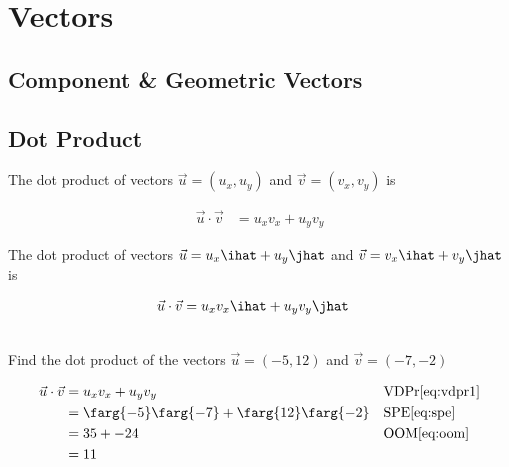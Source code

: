 %
%


\chapter{Vectors}

\section{Component \& Geometric Vectors}


\section{Dot Product}

\begin{definition}
The dot product of vectors $\vec{u}=(u_x,u_y)$ and $\vec{v}=(v_x, v_y)$ is 

\begin{align}
\vec{u} \cdot \vec{v} 	&= u_x v_x + u_y v_y  \label{eq:vdpr1}
\end{align}

The dot product of vectors $\vec{u}=u_x \ihat + u_y \jhat$ and $\vec{v}=v_x \ihat + v_y \jhat$ is 

\begin{align}
\vec{u} \cdot \vec{v} 	&= u_xv_x \ihat + u_yv_y \jhat \label{eq:vdpr2}
\end{align}

\end{definition}

\begin{example}[id:20141214-195907] \label{20141214-195907} \hfill \\

Find the dot product of the vectors $\vec{u}=(-5,12)$ and $\vec{v}=(-7,- 2)$

\soln

\solnsteps
\begin{align*}
\vec{u} \cdot \vec{v} &= u_x v_x + u_y v_y && \text{VDPr} \eqref{eq:vdpr1} \\
&=\farg{-5}\farg{-7} + \farg{12}\farg{-2} && \text{SPE} \eqref{eq:spe} \\
&= 35 + -24  && \text{OOM} \eqref{eq:oom} \\
&= 11
\end{align*}
\end{example}

